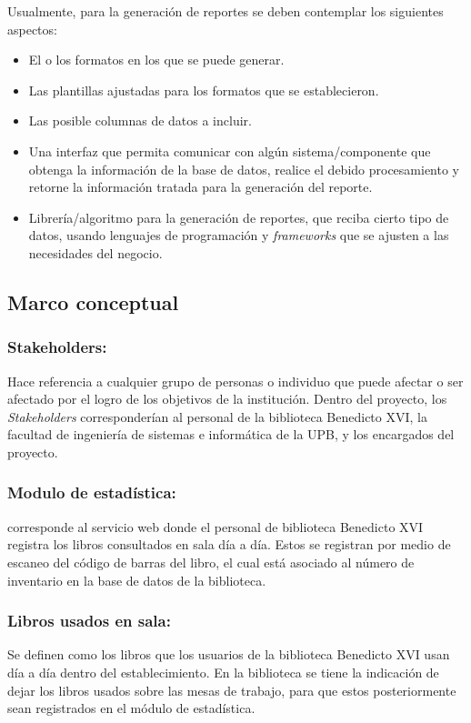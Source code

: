 \documentclass[spanish]{ieee_upb}
\begin{document}
\vspace{0.3cm}
Usualmente, para la generación de reportes se deben contemplar los siguientes aspectos:

\begin{itemize}
    \item El o los formatos en los que se puede generar.
    \item Las plantillas ajustadas para los formatos que se establecieron.
    \item Las posible columnas de datos a incluir.
    \item Una interfaz que permita comunicar con algún sistema/componente que obtenga la información de la base de datos, realice el debido procesamiento y retorne la información tratada para la generación del reporte.
    \item Librería/algoritmo para la generación de reportes, que reciba cierto tipo de datos, usando lenguajes de programación y \textit{frameworks} que se ajusten a las necesidades del negocio.
\end{itemize}

\subsection{Marco conceptual}

    \subsubsection{Stakeholders:} Hace referencia a cualquier grupo de personas o individuo que puede afectar o ser afectado por el logro de los objetivos de la institución\cite{freeman1984strategic}. Dentro del proyecto, los \textit{Stakeholders} corresponderían al personal de la biblioteca Benedicto XVI, la facultad de ingeniería de sistemas e informática de la UPB, y los encargados del proyecto.  
    \subsubsection{Modulo de estadística: } corresponde al servicio web donde el personal de biblioteca Benedicto XVI registra los libros consultados en sala día a día. Estos se registran por medio de escaneo del código de barras del libro, el cual está asociado al número de inventario en la base de datos de la biblioteca.

    \subsubsection{Libros usados en sala: } Se definen como los libros que los usuarios de la biblioteca Benedicto XVI usan día a día dentro del establecimiento. En la biblioteca se tiene la indicación de dejar los libros usados sobre las mesas de trabajo, para que estos posteriormente sean registrados en el módulo de estadística.
    
\end{document}

